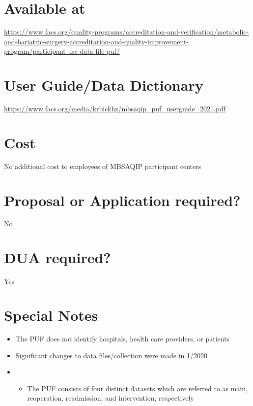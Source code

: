 \documentclass[
]{book}
\providecommand{\tightlist}{%
  \setlength{\itemsep}{0pt}\setlength{\parskip}{0pt}}
\begin{document}
\hypertarget{available-at-40}{%
\section{Available at}\label{available-at-40}}

\url{https://www.facs.org/quality-programs/accreditation-and-verification/metabolic-and-bariatric-surgery-accreditation-and-quality-improvement-program/participant-use-data-file-puf/}

\hypertarget{user-guidedata-dictionary-40}{%
\section{User Guide/Data Dictionary}\label{user-guidedata-dictionary-40}}

\url{https://www.facs.org/media/krbickhz/mbsaqip_puf_userguide_2021.pdf}

\hypertarget{cost-40}{%
\section{Cost}\label{cost-40}}

No additional cost to employees of MBSAQIP participant centers

\hypertarget{proposal-or-application-required-40}{%
\section{Proposal or Application required?}\label{proposal-or-application-required-40}}

No

\hypertarget{dua-required-40}{%
\section{DUA required?}\label{dua-required-40}}

Yes

\hypertarget{special-notes-40}{%
\section{Special Notes}\label{special-notes-40}}

\begin{itemize}
\item
  The PUF does not identify hospitals, health care providers, or patients
\item
  Significant changes to data files/collection were made in 1/2020
\item
  \begin{itemize}
  \tightlist
  \item
    The PUF consists of four distinct datasets which are referred to as main, reoperation, readmission, and intervention, respectively
  \end{itemize}
\end{itemize}
\end{document}
